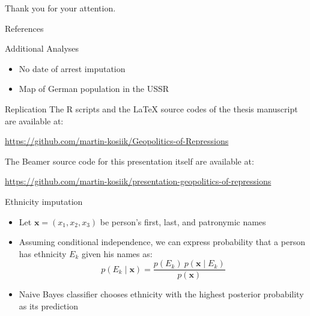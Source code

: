 \documentclass[11pt]{beamer}
\begin{document}
{
\begin{frame}[standout]
  Thank you for your attention.
\end{frame}
}

\appendix

\begin{frame}[allowframebreaks]{References}
\printbibliography
\end{frame}

\begin{frame}[label=add_content]{Additional Analyses}
\begin{itemize}
    \item No date of arrest imputation
    \item Map of German population in the USSR 
\end{itemize}
\end{frame}


\begin{frame}{Replication}
The R scripts and the LaTeX source codes of the thesis manuscript are available at:
  \begin{center}\url{https://github.com/martin-kosiik/Geopolitics-of-Repressions}\end{center}

The Beamer source code for this presentation itself are available at: 
\begin{center}\url{https://github.com/martin-kosiik/presentation-geopolitics-of-repressions}\end{center}
\end{frame}



\begin{frame}[label=ethnicity_imputation]{Ethnicity imputation}
\begin{itemize}
    \item Let  $\boldsymbol{x} = \left(x_1, x_2, x_3\right)$ be person's first, last, and patronymic names
    \item Assuming conditional independence, we can express probability that a person has ethnicity $E_k$ given his names as:
    \begin{equation*}
p(E_k \mid \mathbf{x}) = \frac{p(E_k) \ p(\mathbf{x} \mid E_k)}{p(\mathbf{x})}
\end{equation*}
    \item Naive Bayes classifier chooses ethnicity with the highest posterior probability as its prediction

\end{itemize}
\hyperlink{data}{}
\end{frame}
\end{document}

